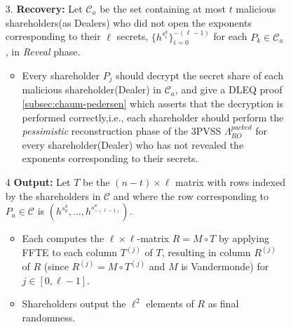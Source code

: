 \begin{figure}[t!]
    \centering
    \begin{tcolorbox}[title=\textbf{Randomness Beacon using 3PVSS, $\Lambda_{RO}^{packed}$ (cont.)}, width=0.9\textwidth, colframe=blue!75!black, colback=blue!10, sharp corners]
        \begin{enumerate}
            \item [3.]\textbf{Recovery:} Let $\mathcal{C}_a$ be the set containing at most $t$ malicious shareholders(as Dealers) who did not open the exponents corresponding to their $\ell$ secrets, $\{h^{s_i^k}\}_{i=0}^{-(\ell-1)}$ for each $P_k\in\mathcal{C}_a$, in \textit{Reveal} phase.
            \begin{itemize}
                \item Every shareholder $P_j$ should decrypt the secret share of each malicious shareholder(Dealer) in $\mathcal{C}_a$, and give a DLEQ proof \ref{subsec:chaum-pedersen} which asserts that the decryption is performed correctly,i.e., each shareholder should perform the \textit{pessimistic} reconstruction phase of the 3PVSS $\Lambda_{RO}^{packed}$ for every shareholder(Dealer) who has not revealed the exponents corresponding to their secrets.
            \end{itemize}
            
            \item [4]\textbf{Output:}  Let $T$ be the $(n - t) \times \ell$ matrix with rows indexed by the shareholders in $\mathcal{C}$ and where the row corresponding to $P_a \in \mathcal{C}$ is $(h^{s_0^a} , . . . , h^{s_{-(\ell-1)}^a})$.
            \begin{itemize}
                \item Each computes the $\ell \times \ell$-matrix $R = M \circ T$ by applying FFTE to each column $T^{(j)}$ of $T$, resulting in column $R^{(j)}$ of $R$ (since $R^{(j)} = M \circ T^{(j)}$ and $M$ is Vandermonde) for $j \in [0, \ell - 1]$.
                \item Shareholders output the $\ell^2$ elements of $R$ as final randomness.
            \end{itemize}
        

\end{enumerate}
\end{tcolorbox}
\end{figure}
